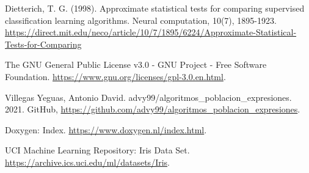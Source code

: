 \begin{thebibliography}{9}

	Dietterich, T. G. (1998). Approximate statistical tests for comparing supervised classification learning algorithms. Neural computation, 10(7), 1895-1923. \url{https://direct.mit.edu/neco/article/10/7/1895/6224/Approximate-Statistical-Tests-for-Comparing}


	The GNU General Public License v3.0 - GNU Project - Free Software Foundation. \url{https://www.gnu.org/licenses/gpl-3.0.en.html}.


	Villegas Yeguas, Antonio David. advy99/algoritmos\_poblacion\_expresiones. 2021. GitHub, \url{https://github.com/advy99/algoritmos_poblacion_expresiones}.


	Doxygen: Index. \url{https://www.doxygen.nl/index.html}.


	UCI Machine Learning Repository: Iris Data Set. \url{https://archive.ics.uci.edu/ml/datasets/Iris}.

\end{thebibliography}
